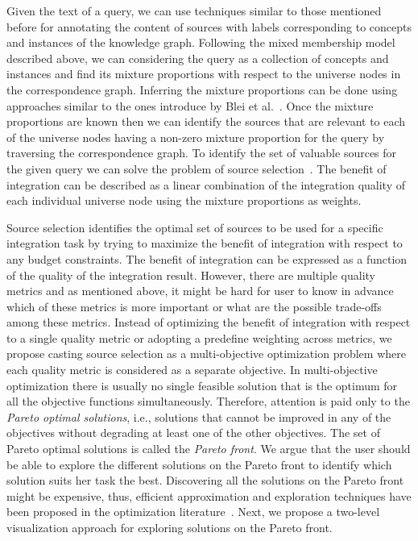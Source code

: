 \documentclass{sig-alternate}
\begin{document}
Given the text of a query, we can use techniques similar to those mentioned before for annotating the content of sources with labels corresponding to concepts and instances of the knowledge graph. Following the mixed membership model described above, we can considering the query as a collection of concepts and instances and find its mixture proportions with respect to the universe nodes in the correspondence graph. Inferring the mixture proportions can be done using approaches similar to the ones introduce by Blei et al.~\cite{blei:2003}. Once the mixture proportions are known then we can identify the sources that are relevant to each of the universe nodes having a non-zero mixture proportion for the query by traversing the correspondence graph. To identify the set of valuable sources for the given query we can solve the problem of source selection~\cite{dong:vldb13, rekatsinas:2014}. The benefit of integration can be described as a linear combination of the integration quality of each individual universe node using the mixture proportions as weights.

Source selection identifies the optimal set of sources to be used for a specific integration task by trying to maximize the benefit of integration with respect to any budget constraints. The benefit of integration can be expressed as a function of the quality of the integration result. However, there are multiple quality metrics and as mentioned above, it might be hard for user to know in advance which of these metrics is more important or what are the possible trade-offs among these metrics. Instead of optimizing the benefit of integration with respect to a single quality metric or adopting a predefine weighting across metrics, we propose casting source selection as a multi-objective optimization problem where each quality metric is considered as a separate objective. In multi-objective optimization there is usually no single feasible solution that is the optimum for all the objective functions simultaneously. Therefore, attention is paid only to the {\em Pareto optimal solutions}, i.e., solutions that cannot be improved in any of the objectives without degrading at least one of the other objectives. The set of Pareto optimal solutions is called the {\em Pareto front}. We argue that the user should be able to explore the different solutions on the Pareto front to identify which solution suits her task the best. Discovering all the solutions on the Pareto front might be expensive, thus, efficient approximation and exploration techniques have been proposed in the optimization literature~\cite{wilson:2001}. Next, we propose a two-level visualization approach for exploring solutions on the Pareto front. 
\end{document}
